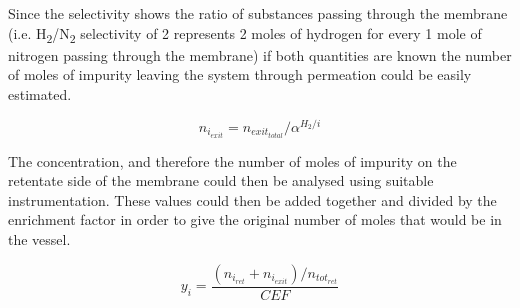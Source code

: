 Since the selectivity shows the ratio of substances passing through the membrane 
(i.e. H\textsubscript{2}/N\textsubscript{2} selectivity of 2 represents 2 moles of hydrogen for every 1 mole 
of nitrogen passing through 
the membrane) if both quantities are known the number of moles of impurity leaving the system through 
permeation could be easily estimated.

\begin{equation}
    n_{i_{exit}} = n_{exit_{total}}/ \alpha^{H_2 /i}    
\end{equation}

The concentration, and therefore the number of moles of impurity on the retentate side of the membrane 
could then be analysed using suitable instrumentation. These values could then be added together and 
divided by the enrichment factor in order to give the original number of moles that would be in the vessel.

\begin{equation}
    y_i=\frac{(n_{i_{ret}}+n_{i_{exit}})/n_{tot_{ret}}}{CEF} 
\end{equation}

